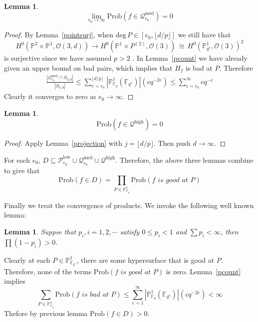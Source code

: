 \documentclass[12pt]{article}
\theoremstyle{plain}
\newtheorem{lemma}[equation]{Lemma}
\theoremstyle{definition}
\newcommand{\sP}{\mathcal{P}}
\newcommand{\IF}{\mathbb{F}}
\newcommand{\IP}{\mathbb{P}}
\newcommand{\sO}{\mathcal{O}}
\renewcommand{\deg}{\mathrm{deg}\,}
\newcommand\iso{{\, \cong \,}}
\newcommand{\<}{\langle}
\renewcommand{\>}{\rangle}
\newcommand{\fl}[1]{\lfloor #1 \rfloor}
\newcommand{\sQ}{\mathcal{Q}}
\newcommand{\Prob}{\mathrm{Prob}}
\begin{document}
\begin{lemma}
$$ \lim_{e_0 \to \infty} \Prob(f \in \sQ_{e_0}^{\mathrm{med}}) = 0 $$
\end{lemma}
\begin{proof}
By Lemma~\ref{pointsurj}, when $\deg P \in [e_0, \lfloor d/p \rfloor]$ we still have that 
$$ H^0(\IP^2 \times \IP^1, \sO(3, d)) \to H^0(\IP^1 \times P^{(2)}, \sO(3)) \iso H^0(\IP^1_{q^e}, \sO(3))^2 $$ is surjective since we have assumed $p > 2$ . In Lemma~\ref{pcount} we have already given an upper bound on bad pairs, which implies that $H_f$ is bad at $P$. Therefore 
\begin{align*}
\frac{|\sQ_{e_0}^{\mathrm{med}} \cap S_{3, d}|}{|S_{3, d}|} \le \sum_{e = e_0}^{\fl{d/p} }|\IP^1_{\IF_{q}}(\IF_{q^e})| (c q^{-2e}) \le \sum_{e = e_0}^{\infty}c q^{-e}
\end{align*}
Clearly it converges to zero as $e_0 \to \infty$. 
\end{proof}

\begin{lemma}
$$ \Prob(f \in \sQ^{\mathrm{high}}) = 0 $$
\end{lemma}
\begin{proof}
Apply Lemma~\ref{projection} with $j = \fl{d/p}$. Then push $d \to \infty$. 
\end{proof}

For each $e_0$, $D \subseteq \sP_{e_0}^{\mathrm{low}} \cup \sQ_{e_0}^{\mathrm{med}} \cup \sQ^{\mathrm{high}}$. Therefore, the above three lemmas combine to give that 
$$ \Prob(f \in D) = \prod_{P \in \IP^1_{\IF_q}} \Prob(f \textit{ is good at }P) $$

Finally we treat the convergence of products. We invoke the following well known lemma:
\begin{lemma}
Suppse that $p_i, i = 1, 2, \cdots$ satisfy $0 \le p_i < 1$ and $\sum p_i < \infty$, then $\prod (1 - p_i) > 0$. 
\end{lemma}

Clearly at each $P \in \IP^1_{\IF_{q^e}}$, there are some hypersurface that is good at $P$. Therefore, none of the terms $\Prob(f \textit{ is good at }P)$ is zero. Lemma~\ref{pcount} implies 
$$ \sum_{P \in \IP^1_{\IF_q}}  \Prob(f \textit{ is bad at }P) \le \sum_{e = 1}^\infty |\IP^1_{\IF_{q}}(\IF_{q^e})| (c q^{-2e}) < \infty $$ Thefore by previous lemma $\Prob(f \in D) > 0 $.
\end{document}
